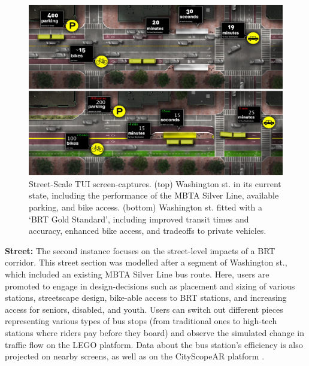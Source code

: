 {{{            \begin{figure}[!htb]
                \begin{center}
                    \includegraphics[width=1\textwidth]{chapters/consensus/BRT/figures/brt3.jpeg}
                \end{center}
                \caption{Street-Scale TUI screen-captures. (top) Washington st. in its current state, including the performance of the MBTA Silver Line, available parking, and bike access. (bottom) Washington st. fitted with a `BRT Gold Standard', including improved transit times and accuracy, enhanced bike access, and tradeoffs to private vehicles.}
                \label{fig:brt_street_viz}
            \end{figure}

            \textbf{Street:} The second instance focuses on the street-level impacts of a BRT corridor. This street section was modelled after a segment of Washington st., which included an existing MBTA Silver Line bus route. Here, users are promoted to engage in design-decisions such as placement and sizing of various stations, streetscape design, bike-able access to BRT stations, and increasing access for seniors, disabled, and youth. Users can switch out different pieces representing various types of bus stops (from traditional ones to high-tech stations where riders pay before they board) and observe the simulated change in traffic flow on the LEGO platform. Data about the bus station's efficiency is also projected on nearby screens, as well as on the CityScopeAR platform \cite{nsl19}.
        }
    }

}
